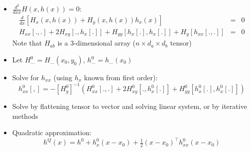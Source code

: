 \documentclass[bigger,handout]{beamer}
\newenvironment{stepitemize}{\begin{itemize}[<+->]}{\end{itemize} }
\begin{document}
\begin{frame}%
 

\begin{stepitemize}
\item $\frac{d ^{2}}{d xx}H(x,h(x))=0$:%
\begin{eqnarray*}
\tfrac{d }{d x}\left[ H_{x}\left( x,h(x)\right) +H_{y}\left(
x,h(x)\right) h_{x}(x)\right] &=&0 \\
H_{xx}[.,.]+2H_{xy}[.,h_{x}[.]]+H_{yy}[h_{x}[.],h_{x}[.]]+H_{y}[h_{xx}[.,.]] &=&0
\end{eqnarray*}%
Note that $H_{ab}$ is a 3-dimensional array ($n \times d_{a} \times d_{b}$ tensor)

\item Let $H_{...}^{0}=H_{...}\left( x_{0},y_{0}\right) $, $%
h_{...}^{0}=h_{...}\left( x_{0}\right) $

\item Solve for $h_{xx}$ (using $h_{x}$ known from first order): 
\begin{equation*}
h_{xx}^{0}[,]=-\left[ H_{y}^{0}\right] ^{-1}\left(
H_{xx}^{0}[.,.]+2H_{xy}^{0}[.,h_{x}^{0}[.]]+H_{yy}^{0}[h_{x}^{0}[.],h_{x}^{0}[.]]\right)
\end{equation*}

\item Solve by flattening tensor to vector and solving linear system, or by iterative methods

\item Quadratic approximation:%
\begin{equation*}
h^{Q}(x)=h^{0}+h_{x}^{0}\left( x-x_{0}\right) +\tfrac{1}{2}\left(
x-x_{0}\right) ^{\top }h_{xx}^{0}\left( x-x_{0}\right)
\end{equation*}
\end{stepitemize}

 
 
\end{frame}%
 
 
 
\end{document}
